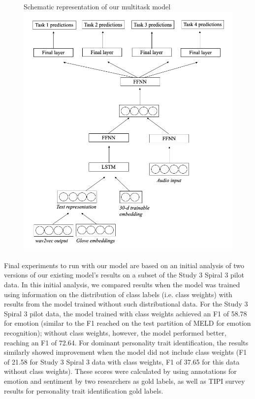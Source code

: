 \begin{figure}
    \begin{sidecaption}{Schematic representation of our multitask model}
    \centering
    \includegraphics[width=\textwidth]{images/sentiment_schematics_study3.png}
    \label{fig:sentiment_model_schematics}
    \end{sidecaption}
\end{figure}

Final experiments to run with our model are based on an initial analysis of two
versions of our existing model's results on a subset of the Study 3 Spiral 3
pilot data. In this initial analysis, we compared results when the model was
trained using information on the distribution of class labels (i.e. class weights)
with results from the model trained without such distributional data. For the
Study 3 Spiral 3 pilot data, the model trained with class weights achieved an F1
of 58.78 for emotion (similar to the F1 reached on the test partition of MELD for
emotion recognition); without class weights, however, the model performed better,
reaching an F1 of 72.64. For dominant personality trait identification, the
results similarly showed improvement when the model did not include class weights
(F1 of 21.58 for Study 3 Spiral 3 data with class weights, F1 of 37.65 for this
data without class weights). These scores were calculated by using annotations
for emotion and sentiment by two researchers as gold labels, as well as TIPI
survey results for personality trait identification gold labels.

